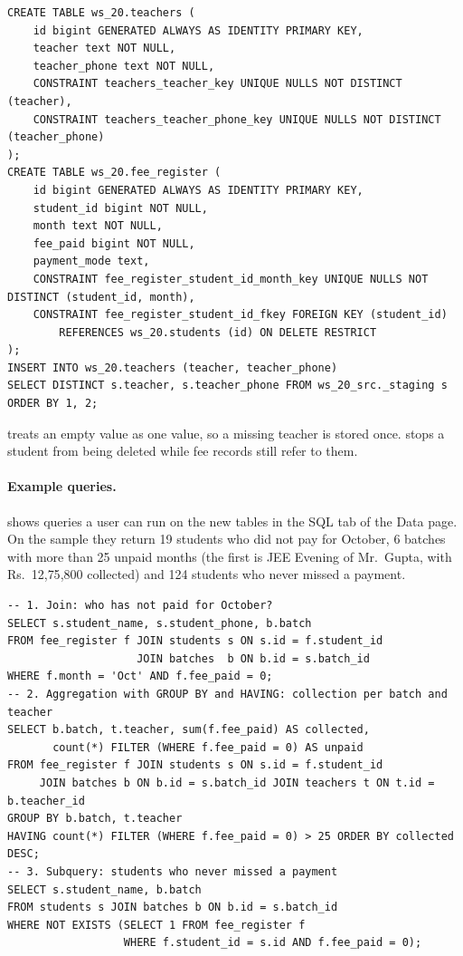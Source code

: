 \begin{lstlisting}[float=tbp,caption={[Generated DDL]Part of the DDL generated for the fee register},label={lst:ddl}]
CREATE TABLE ws_20.teachers (
    id bigint GENERATED ALWAYS AS IDENTITY PRIMARY KEY,
    teacher text NOT NULL,
    teacher_phone text NOT NULL,
    CONSTRAINT teachers_teacher_key UNIQUE NULLS NOT DISTINCT (teacher),
    CONSTRAINT teachers_teacher_phone_key UNIQUE NULLS NOT DISTINCT (teacher_phone)
);
CREATE TABLE ws_20.fee_register (
    id bigint GENERATED ALWAYS AS IDENTITY PRIMARY KEY,
    student_id bigint NOT NULL,
    month text NOT NULL,
    fee_paid bigint NOT NULL,
    payment_mode text,
    CONSTRAINT fee_register_student_id_month_key UNIQUE NULLS NOT DISTINCT (student_id, month),
    CONSTRAINT fee_register_student_id_fkey FOREIGN KEY (student_id)
        REFERENCES ws_20.students (id) ON DELETE RESTRICT
);
INSERT INTO ws_20.teachers (teacher, teacher_phone)
SELECT DISTINCT s.teacher, s.teacher_phone FROM ws_20_src._staging s ORDER BY 1, 2;
\end{lstlisting}

 treats an empty value as one value, so a missing teacher is stored once.
 stops a student from being deleted while fee records still refer to them.

\paragraph{Example queries.}  shows queries a user can run on the new tables in the
SQL tab of the Data page. On the sample they return 19 students who did not pay for October, 6 batches with more
than 25 unpaid months (the first is JEE Evening of Mr.\ Gupta, with Rs.~12{,}75{,}800 collected) and 124
students who never missed a payment.

\begin{lstlisting}[float=tbp,caption={[Example queries]Example queries on the generated database (join, aggregation, subquery)},label={lst:examples}]
-- 1. Join: who has not paid for October?
SELECT s.student_name, s.student_phone, b.batch
FROM fee_register f JOIN students s ON s.id = f.student_id
                    JOIN batches  b ON b.id = s.batch_id
WHERE f.month = 'Oct' AND f.fee_paid = 0;
-- 2. Aggregation with GROUP BY and HAVING: collection per batch and teacher
SELECT b.batch, t.teacher, sum(f.fee_paid) AS collected,
       count(*) FILTER (WHERE f.fee_paid = 0) AS unpaid
FROM fee_register f JOIN students s ON s.id = f.student_id
     JOIN batches b ON b.id = s.batch_id JOIN teachers t ON t.id = b.teacher_id
GROUP BY b.batch, t.teacher
HAVING count(*) FILTER (WHERE f.fee_paid = 0) > 25 ORDER BY collected DESC;
-- 3. Subquery: students who never missed a payment
SELECT s.student_name, b.batch
FROM students s JOIN batches b ON b.id = s.batch_id
WHERE NOT EXISTS (SELECT 1 FROM fee_register f
                  WHERE f.student_id = s.id AND f.fee_paid = 0);
\end{lstlisting}

